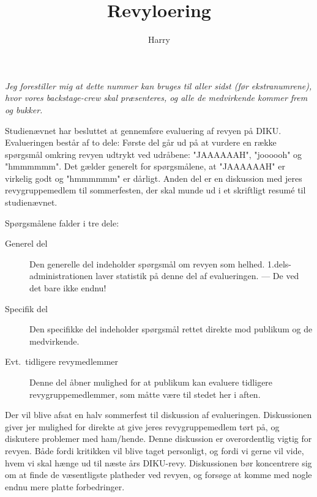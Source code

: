 \documentclass{article}
\title{Revyloering}
\author{Harry}
\begin{document}
\maketitle

\sl\noindent Jeg forestiller mig at dette nummer kan bruges
til aller sidst (før ekstranumrene), hvor vores
backstage-crew skal præsenteres, og alle de medvirkende
kommer frem og bukker.

\begin{sketch}
 Studienævnet har besluttet at gennemføre evaluering af
         revyen på DIKU. Evalueringen består af to dele: Første
         del går ud på at vurdere en række spørgsmål omkring revyen
         udtrykt ved udråbene: "JAAAAAAH", "joooooh" og "hmmmmmm". 
         Det gælder generelt for spørgsmålene, at "JAAAAAAH" er 
         virkelig godt og "hmmmmmm" er dårligt. Anden del er en 
         diskussion med jeres revygruppemedlem til sommerfesten, 
         der skal munde ud i et skriftligt resumé til studienævnet.

         Spørgsmålene falder i tre dele:
         \begin{description}
       \item [Generel del] Den generelle del indeholder spørgsmål 
              om revyen som helhed. 1.dels-administrationen laver 
              statistik på denne del af evalueringen. --- De ved 
              det bare ikke endnu!

       \item [Specifik del] Den specifikke del indeholder
              spørgsmål rettet direkte mod publikum og
              de medvirkende.

       \item [Evt.\ tidligere revymedlemmer] Denne del åbner
              mulighed for at publikum kan evaluere 
              tidligere revygruppemedlemmer, som måtte
              være til stedet her i aften.

         \end{description}
           

         Der vil blive afsat en halv sommerfest til diskussion
         af evalueringen. Diskussionen giver jer mulighed for
         direkte at give jeres revygruppemedlem tørt på, og
         diskutere problemer med ham/hende. Denne diskussion
         er overordentlig vigtig for revyen. Både fordi
         kritikken vil blive taget personligt, og fordi vi
         gerne vil vide, hvem vi skal hænge ud til næste års
         DIKU-revy. Diskussionen bør koncentrere sig om at
         finde de væsentligste platheder ved revyen, og
         forsøge at komme med nogle endnu mere platte
         forbedringer.


\end{sketch}
\end{document}

